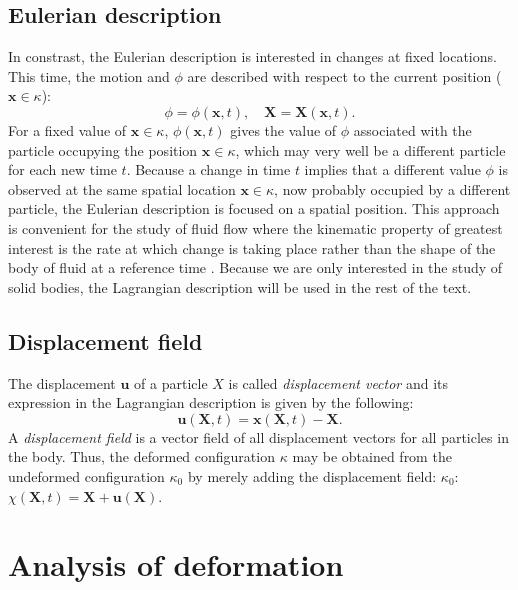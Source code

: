 	\subsection{Eulerian description}
\ON In constrast, the Eulerian description is interested in changes at fixed locations. This time, the motion and $\phi$ are described with respect to the current position ($\mathbf{x} \in \kappa$): \OFF
\begin{equation}
\phi = \phi(\textbf{x}, t), \quad \textbf{X} = \textbf{X}(\textbf{x}, t).
\end{equation}
For a fixed value of $\mathbf{x} \in \kappa$, $\phi(\mathbf{x},t)$ gives the value of $\phi$ associated with the particle occupying the position $\textbf{x} \in \kappa$, which may very well be a different particle for each new time $ t $. Because a change in time $t$ implies that a different value $\phi$ is observed at the same spatial location $\mathbf{x} \in \kappa$, now probably occupied by a different particle, the Eulerian description is focused on a spatial position. This approach is convenient for the study of fluid flow where the kinematic property of greatest interest is the rate at which change is taking place rather than the shape of the body of fluid at a reference time \citep{Spencer80}. Because we are only interested in the study of solid bodies, the Lagrangian description will be used in the rest of the text. 
	
	\subsection{Displacement field}
The displacement $ \mathbf{u} $ of a particle $X$ is called \emph{displacement vector} and its expression in the Lagrangian description is given by the following:
\begin{equation}
\mathbf{u}(\textbf{X}, t) = \mathbf{x}(\mathbf{X}, t) - \mathbf{X}.
\end{equation}
A \emph{displacement field} is a vector field of all displacement vectors for all particles in the body. \ON Thus, the deformed configuration $\kappa$ may be obtained from the undeformed configuration $\kappa_{0}$ by merely adding the displacement field: \OFF $\kappa_{0}$: $\chi(\mathbf{X}, t) = \mathbf{X} + \mathbf{u}(\mathbf{X})$. 
	
\section{Analysis of deformation}

